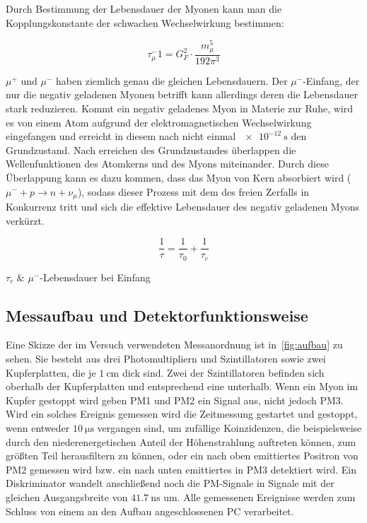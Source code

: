\documentclass[slug=LM, room=Andreas-Schubert-Bau\,\ K\ 1A,
supervisor=Anne-Sophie\ Berthold, coursedate=13.\ 12.\ 2019]{../../Lab_Report_LaTeX/lab_report}
\begin{document}
Durch Bestimmung der Lebensdauer der Myonen kann man die Kopplungskonstante der schwachen
Wechselwirkung bestimmen:

\begin{equation} \label{eq:kopplkonst}
	\tau_\mu^-1 = G_F^2 \cdot \frac{m_\mu^5}{192 \pi^3}
\end{equation}

\(\mu^+\) und \(\mu^-\) haben ziemlich genau die gleichen Lebensdauern. 
Der \(\mu^-\)-Einfang, der nur die negativ geladenen Myonen betrifft kann allerdings deren
die Lebensdauer stark reduzieren.
Kommt ein negativ geladenes Myon in Materie zur Ruhe, wird es von einem Atom aufgrund der
elektromagnetischen Wechselwirkung eingefangen und erreicht in diesem nach nicht einmal
\(\SI{e-12}{\second}\) den Grundzustand. Nach erreichen des Grundzustandes überlappen die
Wellenfunktionen des Atomkerns und des Myons miteinander. Durch diese Überlappung kann es dazu
kommen, dass das Myon von Kern absorbiert wird (\(\mu^- + p \rightarrow n + \nu_\mu\)), sodass 
dieser Prozess mit dem des freien Zerfalls in Konkurrenz tritt und sich die effektive Lebensdauer 
des negativ geladenen Myons verkürzt.

\begin{equation}\label{eq:efflebenszeit}
	\frac{1}{\tau} = \frac{1}{\tau_0} + \frac{1}{\tau_c}
\end{equation}

\begin{conditions}
	\(\tau_c\) & \(\mu^-\)-Lebensdauer bei Einfang
\end{conditions}

\subsection{Messaufbau und Detektorfunktionsweise}
\label{sec:aufbau}

Eine Skizze der im Versuch verwendeten Messanordnung ist in~\ref*{fig:aufbau} zu sehen.
Sie besteht aus drei Photomultipliern und Szintillatoren sowie zwei Kupferplatten, die je
\(\SI{1}{\centi\metre}\) dick sind. Zwei der Szintillatoren befinden sich oberhalb der Kupferplatten
und entsprechend eine unterhalb.
Wenn ein Myon im Kupfer gestoppt wird geben PM1 und PM2 ein Signal aus, nicht jedoch PM3. Wird ein
solches Ereignis gemessen wird die Zeitmessung gestartet und gestoppt, wenn entweder 
\(\SI{10}{\micro\second}\) vergangen sind, um zufällige Koinzidenzen, die beispielsweise durch
den niederenergetischen Anteil der Höhenstrahlung auftreten können, zum größten Teil
herausfiltern zu können, oder
ein nach oben emittiertes Positron von PM2 gemessen wird bzw. ein nach unten emittiertes in
PM3 detektiert wird. Ein Diskriminator wandelt anschließend noch die PM-Signale in Signale mit der
gleichen Ausgangsbreite von \(\SI{41,7}{\nano\second}\) um. Alle gemessenen Ereignisse werden
zum Schluss von einem an den Aufbau angeschlossenen PC verarbeitet.
\end{document}
